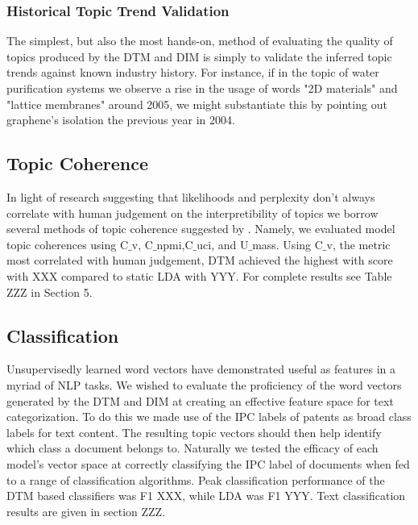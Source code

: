 \subsubsection{Historical Topic Trend Validation}
The simplest, but also the most hands-on, method of evaluating the quality of topics produced by the DTM and DIM is simply to validate the inferred topic trends against known industry history. For instance, if in the topic of water purification systems we observe a rise in the usage of words "2D materials" and "lattice membranes" around 2005, we might substantiate this by pointing out graphene's isolation the previous year in 2004.
 

\subsection{Topic Coherence}
In light of research suggesting that likelihoods and perplexity don't always correlate with human judgement on the interpretibility of topics \parencite{Blei:2006:DTM:1143844.1143859} we borrow several methods of topic coherence suggested by \parencite{DBLP:journals/corr/RosnerHRNB14}. Namely, we evaluated model topic coherences using C$\_$v, C$\_$npmi,C$\_$uci, and U$\_$mass. Using C$\_$v, the metric most correlated with human judgement, DTM achieved the highest with score with XXX compared to static LDA with YYY. For complete results see Table ZZZ in Section 5.


\subsection{Classification}
Unsupervisedly learned word vectors have demonstrated useful as features in a myriad of NLP tasks. We wished to evaluate the proficiency of the word vectors generated by the DTM and DIM at creating an effective feature space for text categorization. To do this we made use of the IPC labels of patents as broad class labels for text content. The resulting topic vectors should then help identify which class a document belongs to. Naturally we tested the efficacy of each model's vector space at correctly classifying the IPC label of documents when fed to a range of classification algorithms. Peak classification performance of the DTM based classifiers was F1 XXX, while LDA was F1 YYY. Text classification results are given in section ZZZ.


